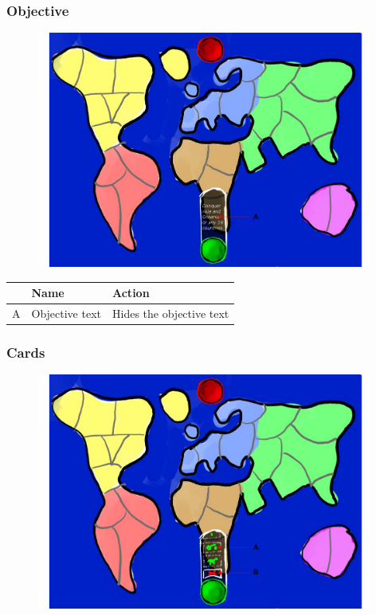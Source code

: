 \documentclass[12pt,a4paper]{article}
\begin{document}
\subsubsection{Objective}

\begin{figure}[H]
  \centering
  \includegraphics[width=11cm]{pic/mocks/2-2.pdf}
\end{figure}

\begin{table}[H]
\small
\centering
\begin{tabular}{c|p{5cm}|p{7cm}}
& Name & Action \\ \hline\hline
A
&Objective text
&Hides the objective text
\end{tabular}
\end{table}

\newpage
\subsubsection{Cards}

\begin{figure}[H]
  \centering
  \includegraphics[width=11cm]{pic/mocks/2-3.pdf}
\end{figure}
\end{document}
